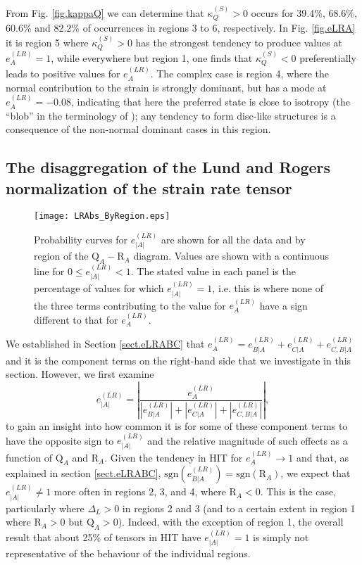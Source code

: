 \documentclass[preprint,amssymb,amsmath,aip,cha]{revtex4-1}
\begin{document}
From Fig. \ref{fig.kappaQ} we can determine that $\kappa_{Q}^{(S)} > 0$ occurs for 39.4\%, 68.6\%, 60.6\% and 82.2\% of occurrences in regions 3 to 6, respectively. In Fig. \ref{fig.eLRA} it is region 5 where $\kappa_{Q}^{(S)} > 0$ has the strongest tendency to produce values at $e^{(LR)}_{A} = 1$, while everywhere but region 1, one finds that $\kappa_{Q}^{(S)} < 0$ preferentially leads to positive values for $e^{(LR)}_{A}$. The complex case is region 4, where the normal contribution to the strain is strongly dominant, but has a mode at $e^{(LR)}_{A} = -0.08$, indicating that here the preferred state is close to isotropy (the ``blob'' in the terminology of \citet{corrsin72}); any tendency to form disc-like structures is a consequence of the non-normal dominant cases in this region.

\subsection{The disaggregation of the {L}und and {R}ogers normalization of the strain rate tensor}
\label{sect.res_eLRBC}

\begin{figure*}
  \texttt{[image: LRAbs\_ByRegion.eps]}
\caption{Probability curves for $e^{(LR)}_{|A|}$ are shown for all the data and by region of the $\mbox{Q}_{A}-\mbox{R}_{A}$ diagram. Values are shown with a continuous line for $0 \le e^{(LR)}_{|A|} < 1$. The stated value in each panel is the percentage of values for which $e^{(LR)}_{|A|} = 1$, i.e. this is where none of the three terms contributing to the value for $e^{(LR)}_{A}$ have a sign different to that for $e^{(LR)}_{A}$.
}
\label{fig.eLR_AbsA}       %
\end{figure*}

We established in Section \ref{sect.eLRABC} that $e^{(LR)}_{A} = e^{(LR)}_{B|A} + e^{(LR)}_{C|A} + e^{(LR)}_{C,B|A}$ and it is the component terms on the right-hand side that we investigate in this section. However, we first examine 
\begin{equation}
e^{(LR)}_{|A|} = \left \lvert \frac{e^{(LR)}_{A}}{|e^{(LR)}_{B|A}| + |e^{(LR)}_{C|A}| + |e^{(LR)}_{C,B|A}|} \right \rvert,
\end{equation}
to gain an insight into how common it is for some of these component terms to have the opposite sign to $e^{(LR)}_{|A|}$ and the relative magnitude of such effects as a function of $\mbox{Q}_{A}$ and $\mbox{R}_{A}$. Given the tendency in HIT for $e^{(LR)}_{A} \to 1$ and that, as explained in section \ref{sect.eLRABC}, $\mbox{sgn}(e^{(LR)}_{B|A}) = \mbox{sgn}(\mbox{R}_{A})$, we expect that $e^{(LR)}_{|A|} \ne 1$ more often in regions 2, 3, and 4, where $\mbox{R}_{A} < 0$. This is the case, particularly where $\Delta_{L} > 0$ in regions 2 and 3 (and to a certain extent in region 1 where $\mbox{R}_{A} > 0$ but $\mbox{Q}_{A} > 0$). Indeed, with the exception of region 1, the overall result that about 25\% of tensors in HIT have $e^{(LR)}_{|A|} = 1$ is simply not representative of the behaviour of the individual regions. 
\end{document}
